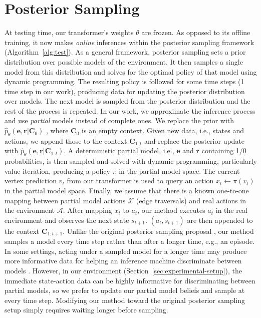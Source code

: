 \documentclass[sigconf]{aamas}
\begin{document}
\section{Posterior Sampling}
\label{sec:post-sampl-plann}
At testing time, our transformer's weights $\theta$ are frozen. As opposed to its offline training, it now makes \textit{online} inferences within the posterior sampling framework (Algorithm~\ref{alg:test}).
As a general framework, posterior sampling sets a prior distribution over possible models of the environment. It then samples a single model from this distribution and solves for the optimal policy of that model using dynamic programming. The resulting policy is followed for some time steps (1 time step in our work), producing data for updating the posterior distribution over models. The next model is sampled from the posterior distribution and the rest of the process is repeated.
In our work, we approximate the inference process and use \textit{partial} models instead of complete ones. We replace the prior with
$\hat{p}_\theta(\mathbf{e}, \mathbf{r}|\mathbf{C}_0)$
, where $\mathbf{C}_{0}$ is an empty context. Given new data, i.e., states and actions, we append those to the context $\mathbf{C}_{1:t}$ and replace the posterior update with $\hat{p}_\theta(\mathbf{e}, \mathbf{r}|\mathbf{C}_{1:t})$. A deterministic partial model, i.e., $\mathbf{e}$ and $\mathbf{r}$ containing 1/0 probabilities, is then sampled and solved with dynamic programming, particularly value iteration, producing a policy $\pi$ in the partial model space.
The current vertex prediction $v_t$ from our transformer is used to query an action $x_t \gets \pi(v_t)$ in the partial model space. Finally, we assume that there is a known one-to-one mapping between partial model actions $\mathscr{X}$ (edge traversals) and real actions in the environment $\mathscr{A}$. After mapping $x_t$ to $a_t$, our method executes $a_t$ in the real environment and observes the next state $s_{t+1}$. $(a_t, s_{t+1})$ are then appended to the context $\mathbf{C}_{1:t+1}$.
Unlike the original posterior sampling proposal \cite{osbandMoreEfficientReinforcement2013,strensBayesianFrameworkReinforcement2000}, our method samples a model every time step rather than after a longer time, e.g., an episode. In some settings, acting under a sampled model for a longer time may produce more informative data for helping an inference machine discriminate between models \cite{russoTutorialThompsonSampling2020}. However, in our environment (Section~\ref{sec:experimental-setup}), the immediate state-action data can be highly informative for discriminating between partial models, so we prefer to update our partial model beliefs and sample at every time step. Modifying our method toward the original posterior sampling setup simply requires waiting longer before sampling.
\end{document}
